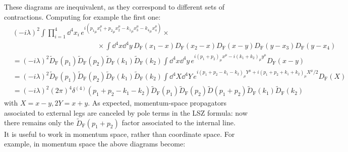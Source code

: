These diagrams are inequivalent, as they correspond to different sets of contractions. Computing for example the first one:
\begin{equation*}
  \begin{split}
    & (-i \lambda)^2 \int \prod_{i = 1}^4 \dd^4x_i\, e^{i ({p_1}_\mu x_1^\mu + {p_2}_\mu x_2^\mu - {k_1}_\mu x_3^\mu - {k_4}_\mu x_4^\mu)} \times \\
    & \qquad \qquad \qquad \qquad \qquad \qquad \times \int \dd^4x \dd^4y\, D_\text{F}(x_1 - x) D_\text{F}(x_2 - x) D_\text{F}(x - y) D_\text{F}(y - x_3) D_\text{F}(y - x_4) \\
    & = (-i \lambda)^2 \tilde{D}_\text{F}(p_1) \tilde{D}_\text{F}(p_2) \tilde{D}_\text{F}(k_1) \tilde{D}_\text{F}(k_2) \int \dd^4x \dd^4y\, e^{i (p_1 + p_2)_\mu x^\mu - i (k_1 + k_2)_\mu y^\mu} D_\text{F}(x - y) \\
    & = (-i \lambda)^2 \tilde{D}_\text{F}(p_1) \tilde{D}_\text{F}(p_2) \tilde{D}_\text{F}(k_1) \tilde{D}_\text{F}(k_2) \int \dd^4X \dd^4Y\, e^{i (p_1 + p_2 - k_1 - k_2)_\mu Y^\mu + i (p_1 + p_2 + k_1 + k_2)_\mu X^\mu / 2} D_\text{F}(X) \\
    & = (-i \lambda)^2 (2\pi)^4 \delta^{(4)}(p_1 + p_2 - k_1 - k_2) \tilde{D}_\text{F}(p_1) \tilde{D}_\text{F}(p_2) \tilde{D}(p_1 + p_2) \tilde{D}_\text{F}(k_1) \tilde{D}_\text{F}(k_2)
  \end{split}
\end{equation*}
with $ X = x - y , 2Y = x + y $. As expected, momentum-space propagators associated to external legs are canceled by pole terms in the LSZ formula: now there remains only the $ \tilde{D}_\text{F}(p_1 + p_2) $ factor associated to the internal line. \\
It is useful to work in momentum space, rather than coordinate space. For example, in momentum space the above diagrams become:
